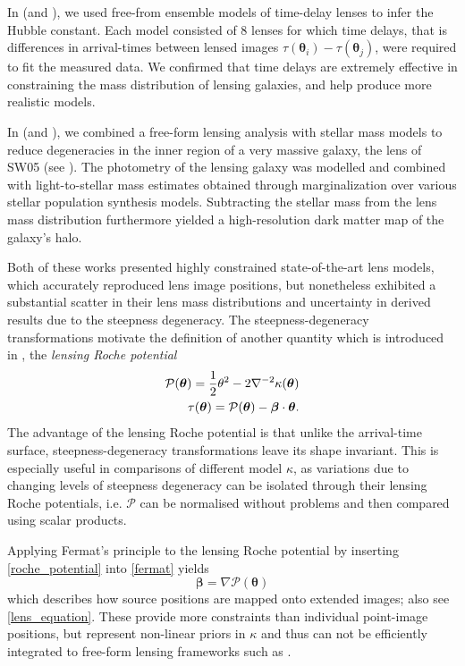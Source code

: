 In  (and ), we used free-from ensemble models of
time-delay lenses to infer the Hubble constant.  Each model consisted of 8
lenses for which time delays, that is differences in arrival-times between
lensed images $\tau(\bm\theta_{i}) - \tau(\bm\theta_{j})$, were required to fit
the measured data.  We confirmed that time delays are extremely effective in
constraining the mass distribution of lensing galaxies, and help produce more
realistic models.

In  (and ), we combined a free-form lensing
analysis with stellar mass models to reduce degeneracies in the inner region of
a very massive galaxy, the lens of SW05 (see ).  The photometry
of the lensing galaxy was modelled and combined with light-to-stellar mass
estimates obtained through marginalization over various stellar population
synthesis models.  Subtracting the stellar mass from the lens mass distribution
furthermore yielded a high-resolution dark matter map of the galaxy's halo.

Both of these works presented highly constrained state-of-the-art lens models,
which accurately reproduced lens image positions, but nonetheless exhibited a
substantial scatter in their lens mass distributions and uncertainty in derived
results due to the steepness degeneracy.  The steepness-degeneracy
transformations motivate the definition of another quantity which is introduced
in , the \textit{lensing Roche potential}
%
\begin{equation}\eqlbl{roche_potential}%
    \begin{aligned}%
        \mathcal{P}(\bm\theta) = 
        \frac{1}{2}\theta^{2} - 2\nabla^{-2}\kappa(\bm\theta) \\
        \tau(\bm\theta) = \mathcal{P}(\bm\theta) - \bm\beta\cdot\bm\theta.
    \end{aligned}%
\end{equation}%
%
The advantage of the lensing Roche potential is that unlike the arrival-time
surface, steepness-degeneracy transformations leave its shape invariant.  This
is especially useful in comparisons of different model $\kappa$, as variations
due to changing levels of steepness degeneracy can be isolated through their
lensing Roche potentials, i.e. $\mathcal{P}$ can be normalised without problems
and then compared using scalar products.

Applying Fermat's principle to the lensing Roche potential by inserting
\eqref*{roche_potential} into \eqref{fermat} yields
%
\begin{equation}%
    \bm\beta = \nabla\mathcal{P}(\bm\theta)
\end{equation}%
%
which describes how source positions are mapped onto extended images; also see
\eqref{lens_equation}.  These provide more constraints than individual
point-image positions, but represent non-linear priors in $\kappa$ and thus can
not be efficiently integrated to free-form lensing frameworks such as
.  

